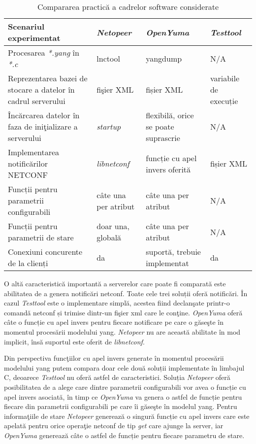 \begin{table}[tp]
	
	\caption{Compararea practică a cadrelor software considerate\label{tab:Table_2}}
	\begin{tabular}{|M{0.35\textwidth}|M{0.17\textwidth}|M{0.17\textwidth}|M{0.16\textwidth}|}
		\hline
		\textbf{Scenariul experimentat} & \textbf{\emph{Netopeer}} & \textbf{\emph{OpenYuma}} & \textbf{\emph{Testtool}} \tabularnewline
		\hline 
		Procesarea \textit{*.yang} în \textit{*.c} & lnctool & yangdump & N/A\tabularnewline
		\hline 
		Reprezentarea bazei de stocare a datelor în cadrul serverului & fişier XML & fișier XML & variabile de execuție \tabularnewline
		\hline 
		Încărcarea datelor în faza de iniţializare a serverului & \textit{startup} & flexibilă, orice se poate suprascrie & N/A \tabularnewline
		\hline 
		Implementarea notificărilor NETCONF & \textit{libnetconf} & funcție cu apel invers oferită & fișier XML \tabularnewline
		\hline 
		Funcții pentru parametrii configurabili & câte una per atribut & câte una per atribut & N/A\tabularnewline
		\hline 
		Funcții pentru parametrii de stare & doar una, globală & câte una per atribut & N/A\tabularnewline
		\hline 
		Conexiuni concurente de la clienți & da & suportă, trebuie implementat & da\tabularnewline
		\hline \end{tabular}
\end{table}

O altă caracteristică importantă a serverelor care poate fi comparată este abilitatea de a genera notificări \gls{netconf}. Toate cele trei soluții oferă notificări. În cazul \textit{Testtool} este o implementare simplă, acestea fiind declanşate printr-o comandă \gls{netconf} și trimise dintr-un fişier \gls{xml} care le conţine. \textit{OpenYuma} oferă câte o funcție cu apel invers pentru fiecare notificare pe care o găseşte în momentul procesării modelului \gls{yang}. \textit{Netopeer} nu are această abilitate în mod implicit, însă suportul este oferit de \textit{libnetconf}.

Din perspectiva funcţiilor cu apel invers generate în momentul procesării modelului \gls{yang} putem compara doar cele două soluții implementate în limbajul C, deoarece \textit{Testtool} nu oferă astfel de caracteristici. Soluția \textit{Netopeer} oferă posibilitatea de a alege care dintre parametrii configurabili vor avea o funcție cu apel invers asociată, în timp ce \textit{OpenYuma} va genera o astfel de funcție pentru fiecare din parametrii configurabili pe care îi găseşte în modelul \gls{yang}. Pentru informaţiile de stare \textit{Netopeer} generează o singură funcție cu apel invers care este apelată pentru orice operaţie \gls{netconf} de tip \textit{get} care ajunge la server, iar \textit{OpenYuma} generează câte o astfel de funcție pentru fiecare parametru de stare.

